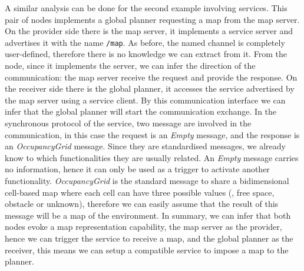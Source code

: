 A similar analysis can be done for the second example involving services. This pair of nodes implements a global planner requesting a map from the map server. On the provider side there is the map server, it implements a service server and advertises it with the name \texttt{/map}. As before, the named channel is completely user-defined, therefore there is no knowledge we can extract from it. From the node, since it implements the server, we can infer the direction of the communication: the map server receive the request and provide the response. On the receiver side there is the global planner, it accesses the service advertised by the map server using a service client. By this communication interface we can infer that the global planner will start the communication exchange. In the synchronous protocol of the service, two message are involved in the communication, in this case the request is an \textit{Empty} message, and the response is an \textit{OccupancyGrid} message. Since they are standardised messages, we already know to which functionalities they are usually related. An \textit{Empty} message carries no information, hence it can only be used as a trigger to activate another functionality. \textit{OccupancyGrid} is the standard message to share a bidimensional cell-based map where each cell can have three possible values (\ie, free space, obstacle or unknown), therefore we can easily assume that the result of this message will be a map of the environment. In summary, we can infer that both nodes evoke a map representation capability, the map server as the provider, hence we can trigger the service to receive a map, and the global planner as the receiver, this means we can setup a compatible service to impose a map to the planner.

